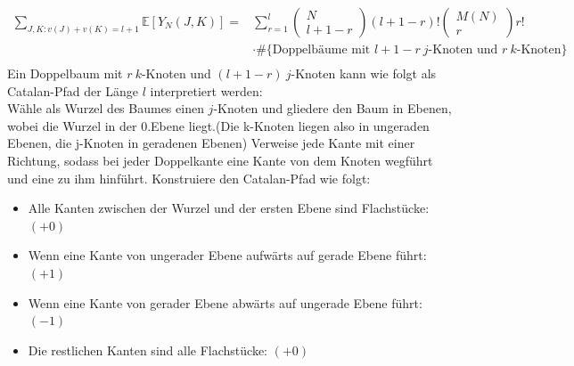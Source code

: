 \documentclass[a4paper, 11pt]{scrreprt}
\newcommand{\EE}{\mathbb{E}}
\begin{document}
\begin{equation}
	\begin{split}
	\sum_{J,K: v(J)+v(K) = l+1} \EE[Y_N(J,K)] = &\sum_{r=1}^{l}\begin{pmatrix} N\\ l+1-r\end{pmatrix} (l+1-r)! \begin{pmatrix} M(N)\\r\end{pmatrix} r! \\
	&\cdot \#\{\text{Doppelbäume mit }l+1-r\ j\text{-Knoten und } r\ k\text{-Knoten}\} \\
	\end{split}
\end{equation}
Ein Doppelbaum mit \(r\  k\)-Knoten und \((l+1-r)\ j\)-Knoten kann wie folgt als Catalan-Pfad der Länge \(l\) interpretiert werden:\\
Wähle als Wurzel des Baumes einen \(j\)-Knoten und gliedere den Baum in Ebenen, wobei die Wurzel in der 0.Ebene liegt.(Die k-Knoten liegen also in ungeraden Ebenen, die j-Knoten in geradenen Ebenen) Verweise jede Kante mit einer Richtung, sodass bei jeder Doppelkante eine Kante von dem Knoten wegführt und eine zu ihm hinführt. Konstruiere den Catalan-Pfad wie folgt:\\
\begin{itemize}
	\item Alle Kanten zwischen der Wurzel und der ersten Ebene sind Flachstücke: \((+0)\)
	\item Wenn eine Kante von ungerader Ebene aufwärts auf gerade Ebene führt: \((+1)\)
	\item Wenn eine Kante von gerader Ebene abwärts auf ungerade Ebene führt: \((-1)\)
	\item Die restlichen Kanten sind alle Flachstücke: \((+0)\)
\end{itemize}
\end{document}
